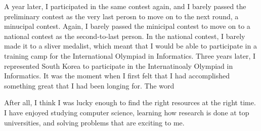 A year later, I participated in the same contest again, and I barely passed the preliminary contest as the very last perosn to move on to the next round, a minucipal contest. Again, I barely passed the minicipal contest to move on to a national contest as the second-to-last person. In the national contest, I barely made it to a sliver medalist, which meant that I would be able to participate in a training camp for the International Olympiad in Informatics. Three years later, I represented South Korea to participate in the Internatinoaly Olympiad in Informatics. It was the moment when I first felt that I had accomplished something great that I had been longing for. The word 



After all, I think I was lucky enough to find the right resources at the right time.  I have enjoyed studying computer science, learning how research is done at top universities, and solving problems that are exciting to me.


